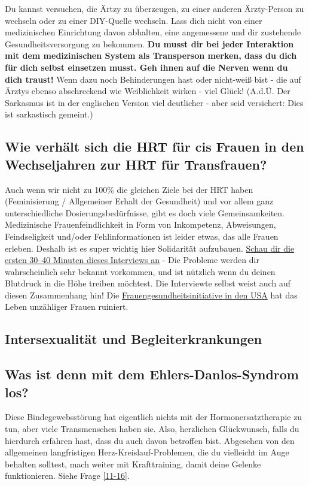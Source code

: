 \documentclass{article}
\begin{document}
Du kannst versuchen, die Ärtzy zu überzeugen, zu einer anderen Ärzty-Person zu wechseln oder zu einer DIY-Quelle wechseln. Lass dich nicht von einer medizinischen Einrichtung davon abhalten, eine angemessene und dir zustehende Gesundheitsversorgung zu bekommen. \textbf{Du musst dir bei jeder Interaktion mit dem medizinischen System als Transperson merken, dass du dich für dich selbst einsetzen musst. Geh ihnen auf die Nerven wenn du dich traust! } Wenn dazu noch Behinderungen hast oder nicht-weiß bist - die auf Ärztys ebenso abschreckend wie Weiblichkeit wirken - viel Glück! (A.d.Ü. Der Sarkasmus ist in der englischen Version viel deutlicher - aber seid versichert: Dies ist sarkastisch gemeint.)

\subsection{Wie verhält sich die HRT für cis Frauen in den Wechseljahren zur HRT für Transfrauen?}\label{11-29}

Auch wenn wir nicht zu 100\% die gleichen Ziele bei der HRT haben (Feminisierung / Allgemeiner Erhalt der Gesundheit) und vor allem ganz unterschiedliche Dosierungsbedürfnisse, gibt es doch viele Gemeinsamkeiten. Medizinische Frauenfeindlichkeit in Form von Inkompetenz, Abweisungen, Feindseligkeit und/oder Fehlinformationen ist leider etwas, das alle Frauen erleben. Deshalb ist es super wichtig hier Solidarität aufzubauen. \href{https://www.youtube.com/watch?v=W0XW6av2wLQ}{Schau dir die ersten 30–40 Minuten dieses Interviews an} - Die Probleme werden dir wahrscheinlich sehr bekannt vorkommen, und ist nützlich wenn du deinen Blutdruck in die Höhe treiben möchtest. Die Interviewte selbst weist auch auf diesen Zusammenhang hin! Die \href{https://en.wikipedia.org/wiki/Women's_Health_Initiative}{Frauengesundheitsinitiative in den USA} hat das Leben unzähliger Frauen ruiniert.

\subsection*{Intersexualität und Begleiterkrankungen}

\subsection{Was ist denn mit dem Ehlers-Danlos-Syndrom los?}

Diese Bindegewebsstörung hat eigentlich nichts mit der Hormonersatztherapie zu tun, aber viele Transmenschen haben sie. Also, herzlichen Glückwunsch, falls du hierdurch erfahren hast, dass du auch davon betroffen bist. Abgesehen von den allgemeinen langfristigen Herz-Kreislauf-Problemen, die du vielleicht im Auge behalten solltest, mach weiter mit Krafttraining, damit deine Gelenke funktionieren. Siehe Frage \ref{11-16}.
\end{document}
